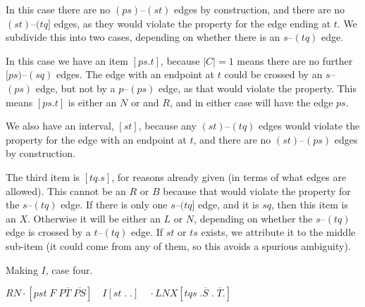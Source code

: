 In this case there are no $(ps)$--$(st)$ edges by construction, and there are no $(st)$--$(tq]$ edges, as they would violate the \oneEC property for the edge ending at $t$.
We subdivide this into two cases, depending on whether there is an $s$--$(tq)$ edge.

\begin{center}
\end{center}

In this case we have an item $[ps.t]$, because $|C| = 1$ means there are no further $[ps)$--$(sq)$ edges.
The edge with an endpoint at $t$ could be crossed by an $s$--$(ps)$ edge, but not by a $p$--$(ps)$ edge, as that would violate the \oneEC property.
This means $[ps.t]$ is either an $N$ or and $R$, and in either case will have the edge $ps$.

We also have an interval, $[st]$, because any $(st)$--$(tq)$ edges would violate the \oneEC property for the edge with an endpoint at $t$, and there are no $(st)$--$(ps)$ edges by construction.

The third item is $[tq.s]$, for reasons already given (in terms of what edges are allowed).
This cannot be an $R$ or $B$ because that would violate the \oneEC property for the $s$--$(tq)$ edge.
If there is only one $s$--$(tq]$ edge, and it is $sq$, then this item is an $X$.
Otherwise it will be either an $L$ or $N$, depending on whether the $s$--$(tq)$ edge is crossed by a $t$--$(tq)$ edge.
If $st$ or $ts$ exists, we attribute it to the middle sub-item (it could come from any of them, so this avoids a spurious ambiguity).

\begin{finalEquation}
\caption{Making $I$, case four.}
  $RN\cdotp [pst \; F \; P\overline{T} \; \overline{PS}] \quad I[st \; . \; .] \quad \cdotp LNX[tqs \; .\overline{S} \; . \; \overline{T}.]$
\end{finalEquation}

